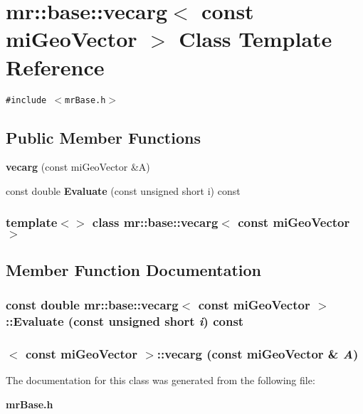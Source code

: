 \section{mr::base::vecarg$<$ const mi\-Geo\-Vector $>$ Class Template Reference}
\label{classmr_1_1base_1_1vecarg_3_01const_01miGeoVector_01_4}
{\tt \#include $<$mr\-Base.h$>$}

\subsection*{Public Member Functions}
\begin{CompactItemize}
\item 
{\bf vecarg} (const mi\-Geo\-Vector \&A)
\item 
const double {\bf Evaluate} (const unsigned short i) const 
\end{CompactItemize}
\subsubsection*{template$<$$>$ class mr::base::vecarg$<$ const mi\-Geo\-Vector $>$}



\subsection{Member Function Documentation}
\subsubsection{\setlength{\rightskip}{0pt plus 5cm}const double {\bf mr::base::vecarg}$<$ const mi\-Geo\-Vector $>$::Evaluate (const unsigned short {\em i}) const\hspace{0.3cm}{\tt  [inline]}}\label{classmr_1_1base_1_1vecarg_3_01const_01miGeoVector_01_4_a1}


\subsubsection{$<$ const mi\-Geo\-Vector $>$::{\bf vecarg} (const mi\-Geo\-Vector \& {\em A})\hspace{0.3cm}{\tt  [inline]}}\label{classmr_1_1base_1_1vecarg_3_01const_01miGeoVector_01_4_a0}




The documentation for this class was generated from the following file:\begin{CompactItemize}
\item 
{\bf mr\-Base.h}\end{CompactItemize}

